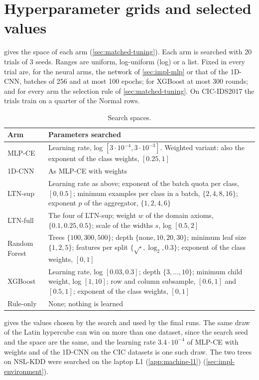 \chapter{Hyperparameter grids and selected values}
\label{app:hyperparameters}

 gives the space of each arm (\cref{sec:matched-tuning}). Each arm
is searched with 20 trials of 3 seeds. Ranges are uniform, log-uniform (log) or a list.
Fixed in every trial are, for the neural arms, the network of \cref{sec:impl-mlp} or that of the
1D-CNN, batches of 256 and at most 100 epochs; for XGBoost at most 300 rounds; and for every arm
the selection rule of \cref{sec:matched-tuning}. On CIC-IDS2017 the trials train on a quarter of
the Normal rows.

\begin{table}[htbp]
\centering
\footnotesize
\caption{Search spaces.}
\label{tab:tuning-spaces}
\setlength{\tabcolsep}{4pt}
\begin{tabular}{@{}p{2.3cm}p{10.3cm}@{}}
\toprule
Arm & Parameters searched \\
\midrule
MLP-CE & Learning rate, log $[3\cdot10^{-4}, 3\cdot10^{-3}]$. Weighted variant: also the
  exponent of the class weights, $[0.25, 1]$ \\
1D-CNN & As MLP-CE with weights \\
LTN-sup & Learning rate as above; exponent of the batch quota per class, $[0, 0.5]$;
  minimum examples per class in a batch, $\{2,4,8,16\}$; exponent $p$ of the
  aggregator, $\{1,2,4,6\}$ \\
LTN-full & The four of LTN-sup; weight $w$ of the domain axioms, $\{0.1, 0.25, 0.5\}$;
  scale of the widths $s$, log $[0.5, 2]$ \\
Random Forest & Trees $\{100,300,500\}$; depth $\{$none$,10,20,30\}$; minimum leaf size
  $\{1,2,5\}$; features per split $\{\sqrt{\cdot},\log_2,0.3\}$; exponent of the class
  weights, $[0, 1]$ \\
XGBoost & Learning rate, log $[0.03, 0.3]$; depth $\{3,\dots,10\}$; minimum child
  weight, log $[1, 10]$; row and column subsample, $[0.6, 1]$ and $[0.5, 1]$; exponent
  of the class weights, $[0, 1]$ \\
Rule-only & None; nothing is learned \\
\bottomrule
\end{tabular}
\end{table}

 gives the values chosen by the search and used by the final runs. The
same draw of the Latin hypercube can win on more than one dataset, since the search seed and the
space are the same, and the learning rate $3.4\cdot10^{-4}$ of MLP-CE with weights and of the
1D-CNN on the CIC datasets is one such draw. The two trees on NSL-KDD were searched on the laptop L1 (\cref{app:machine-l1})
(\cref{sec:impl-environment}).


